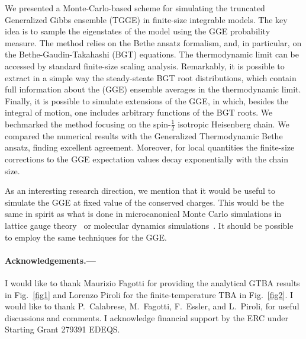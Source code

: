 \documentclass[twocolumn,superscriptaddress,prb,10pt]{revtex4-1}
\begin{document}
We presented a Monte-Carlo-based scheme for simulating the truncated Generalized 
Gibbs ensemble (TGGE) in finite-size integrable models. The key idea is to sample the 
eigenstates of the model using the GGE probability measure. The method relies on the 
Bethe ansatz formalism, and, in particular, on the Bethe-Gaudin-Takahashi (BGT) equations. 
The thermodynamic limit can be accessed by standard finite-size scaling analysis. 
Remarkably, it is possible to extract in a simple way the steady-steate BGT root 
distributions, which contain full information about the (GGE) ensemble averages 
in the thermodynamic limit. Finally, it is possible to simulate extensions of 
the GGE, in which, besides the integral of motion, one includes arbitrary functions 
of the BGT roots. 
We bechmarked the method focusing on the spin-$\frac{1}{2}$ isotropic Heisenberg chain. 
We compared the numerical results with the Generalized Thermodynamic Bethe ansatz, 
finding excellent agreement. Moreover, for local quantities the finite-size corrections 
to the GGE expectation values decay exponentially with the chain size. 

As an interesting research direction, we mention that it would be useful to simulate 
the GGE at fixed value of the conserved charges. This would be the same in spirit as 
what is done in microcanonical Monte Carlo simulations in lattice gauge 
theory~\cite{creutz-1983} or molecular dynamics simulations~\cite{lustig-1998}. It 
should be possible to employ the same techniques for the GGE. 

\paragraph*{Acknowledgements.---}
I would like to thank Maurizio Fagotti for providing the analytical GTBA results in 
Fig.~\ref{fig1} and Lorenzo Piroli for the finite-temperature TBA in Fig.~\ref{fig2}. 
I would like to thank P.~Calabrese, M.~Fagotti, F.~Essler, and L.~Piroli,  for useful 
discussions and comments. I acknowledge financial support by the ERC under Starting 
Grant 279391 EDEQS. 
\end{document}
